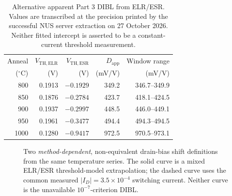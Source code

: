 \begin{table}[H]\centering\small
\caption{Alternative apparent Part 3 DIBL from ELR/ESR.
Values are transcribed at the precision printed by the
successful NUS server extraction on 27 October 2026.
Neither fitted intercept is asserted to be a
constant-current threshold measurement.}
\begin{tabular}{@{}rrrrr@{}}\toprule
Anneal & $V_{\mathrm{TH,ELR}}$ &
$V_{\mathrm{TH,ESR}}$ & $D_{\mathrm{app}}$ &
Window range\\
($^\circ$C) & (V) & (V) & (mV/V) & (mV/V)\\\midrule
800  & 0.1913 & $-0.1929$ & 349.2 & 346.7--349.9\\
850  & 0.1876 & $-0.2784$ & 423.7 & 418.1--424.5\\
900  & 0.1937 & $-0.2997$ & 448.5 & 446.0--449.1\\
950  & 0.1961 & $-0.3477$ & 494.4 & 494.3--494.5\\
1000 & 0.1280 & $-0.9417$ & 972.5 & 970.5--973.1\\
\bottomrule\end{tabular}
\end{table}

\begin{figure}[H]\centering
{}
\caption{Two \emph{method-dependent}, non-equivalent
drain-bias shift definitions from the same temperature series.
The solid curve is a mixed ELR/ESR threshold-model extrapolation;
the dashed curve uses the common measured
$|I_D|=3.5\times10^{-4}$ switching current.
Neither curve is the unavailable $10^{-7}$-criterion DIBL.}
\label{fig:part3_secondary_drain_shifts}
\end{figure}


